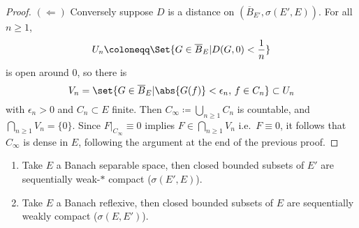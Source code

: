 \documentclass[twoside]{article}
\begin{document}
\begin{proof}
  $(\Leftarrow)$ Conversely suppose $D$ is a distance on $(\overline{B}_{E'}, \sigma(E', E))$. For all $n \geq 1$,
  \begin{equation*}
    U_n \coloneqq \Set{G \in \overline{B}_E | D(G, 0) < \frac{1}{n}}
  \end{equation*}
  is open around $0$, so there is
  \begin{equation*}
    V_n = \set{G \in \overline{B}_E | \abs{G(f)}< \epsilon_n,\, f \in C_n} \subset U_n
  \end{equation*}
  with $\epsilon_n > 0$ and $C_n \subset E$ finite.
  Then $C_\infty \coloneqq \bigcup_{n \geq 1} C_n$ is countable, and $\bigcap_{n \geq 1} V_n = \{0\}$.
  Since $F|_{C_\infty} \equiv 0$ implies $F \in \bigcap_{n \geq 1} V_n$ i.e.\ $F \equiv 0$, it follows that $C_\infty$ is dense in $E$, following the argument at the end of the previous proof.
\end{proof}
\begin{prop}\leavevmode
    \begin{enumerate}[label=(\roman*)]
        \item Take $E$ a Banach separable space, then closed bounded subsets of $E'$ are sequentially weak-$*$ compact ($\sigma(E', E)$).
        \item Take $E$ a Banach reflexive, then closed bounded subsets of $E$ are sequentially weakly compact ($\sigma(E, E')$).
    \end{enumerate}
\end{prop}
\end{document}
